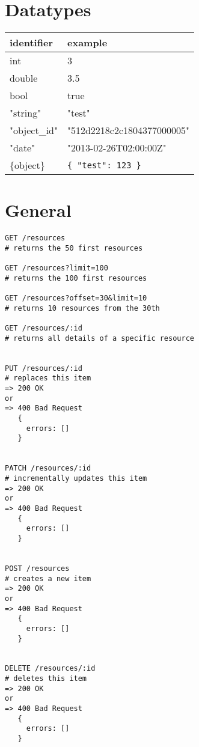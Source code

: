 \label{appendix:REST}

\section{Datatypes}
\begin{tabular}{ l | l }
\hline
identifier & example \\ \hline
int & 3 \\
double & 3.5 \\
bool & true \\
"string" & "test" \\
"object\_id" & "512d2218c2c1804377000005"\footnotemark[1] \\
"date" & "2013-02-26T02:00:00Z"\footnotemark[2] \\
\{object\} & \verb+{ "test": 123 }+ \\ \hline
\end{tabular}

\section{General}

\begin{lstlisting}[language=restinterface]
GET /resources
# returns the 50 first resources

GET /resources?limit=100
# returns the 100 first resources

GET /resources?offset=30&limit=10
# returns 10 resources from the 30th

GET /resources/:id
# returns all details of a specific resource


PUT /resources/:id
# replaces this item 
=> 200 OK
or
=> 400 Bad Request
   {
     errors: []
   }


PATCH /resources/:id
# incrementally updates this item
=> 200 OK
or
=> 400 Bad Request
   {
     errors: []
   } 


POST /resources
# creates a new item
=> 200 OK
or
=> 400 Bad Request
   {
     errors: []
   }


DELETE /resources/:id
# deletes this item
=> 200 OK
or
=> 400 Bad Request
   {
     errors: []
   }

\end{lstlisting}


